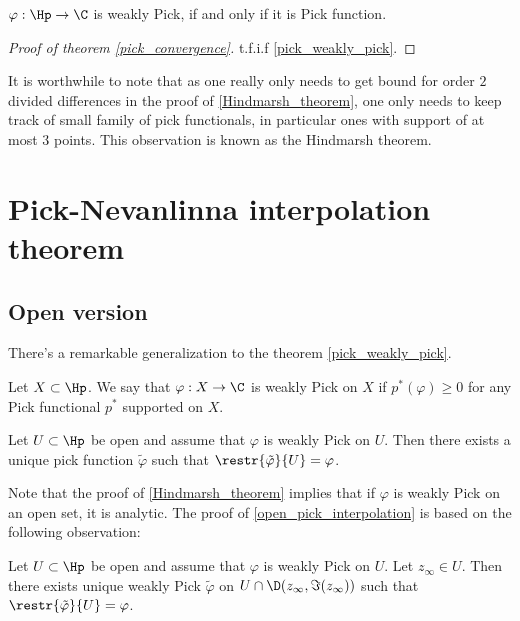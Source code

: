 \begin{kor}\label{pick_weakly_pick}
	$\varphi : \Hp \to \C$ is weakly Pick, if and only if it is Pick function.
\end{kor}

\begin{proof}[Proof of theorem \ref{pick_convergence}]
	t.f.i.f \ref{pick_weakly_pick}.
\end{proof}

It is worthwhile to note that as one really only needs to get bound for order $2$ divided differences in the proof of \ref{Hindmarsh_theorem}, one only needs to keep track of small family of pick functionals, in particular ones with support of at most $3$ points. This observation is known as the Hindmarsh theorem.

\section{Pick-Nevanlinna interpolation theorem}

\subsection{Open version}

There's a remarkable generalization to the theorem \ref{pick_weakly_pick}.

\begin{maar}
	Let $X \subset \Hp$. We say that $\varphi : X \to \C$ is weakly Pick on $X$ if $p^{*}(\varphi) \geq 0$ for any Pick functional $p^{*}$ supported on $X$.
\end{maar}

\begin{lause}\label{open_pick_interpolation}
	Let $U \subset \Hp$ be open and assume that $\varphi$ is weakly Pick on $U$. Then there exists a unique pick function $\tilde{\varphi}$ such that $\restr{\tilde{\varphi}}{U} = \varphi$.
\end{lause}

Note that the proof of \ref{Hindmarsh_theorem} implies that if $\varphi$ is weakly Pick on an open set, it is analytic. The proof of \ref{open_pick_interpolation} is based on the following observation:

\begin{lem}\label{open_pick_lemma}
	Let $U \subset \Hp$ be open and assume that $\varphi$ is weakly Pick on $U$. Let $z_{\infty} \in U$. Then there exists unique weakly Pick $\tilde{\varphi}$ on $U \cap \D(z_{\infty}, \Im(z_{\infty}))$ such that $\restr{\tilde{\varphi}}{U} = \varphi$.
\end{lem}

